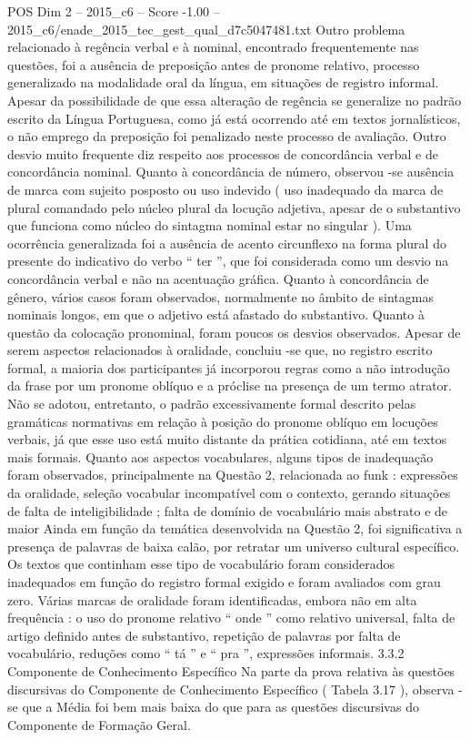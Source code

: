 \begin{textsample}{POS Dim 2 – 2015\_c6 – Score -1.00 – 2015\_c6/enade\_2015\_tec\_gest\_qual\_d7c5047481.txt}
Outro problema relacionado à regência verbal e à nominal, encontrado frequentemente nas questões, foi a ausência de preposição antes de pronome relativo, processo generalizado na modalidade oral da língua, em situações de registro informal.
Apesar da possibilidade de que essa alteração de regência se generalize no padrão escrito da Língua Portuguesa, como já está ocorrendo até em textos jornalísticos, o não emprego da preposição foi penalizado neste processo de avaliação.
Outro desvio muito frequente diz respeito aos processos de concordância verbal e de concordância nominal.
Quanto à concordância de número, observou -se ausência de marca com sujeito posposto ou uso indevido ( uso inadequado da marca de plural comandado pelo núcleo plural da locução adjetiva, apesar de o substantivo que funciona como núcleo do sintagma nominal estar no singular ).
Uma ocorrência generalizada foi a ausência de acento circunflexo na forma plural do presente do indicativo do verbo “ ter ”, que foi considerada como um desvio na concordância verbal e não na acentuação gráfica.
Quanto à concordância de gênero, vários casos foram observados, normalmente no âmbito de sintagmas nominais longos, em que o adjetivo está afastado do substantivo.
Quanto à questão da colocação pronominal, foram poucos os desvios observados.
Apesar de serem aspectos relacionados à oralidade, concluiu -se que, no registro escrito formal, a maioria dos participantes já incorporou regras como a não introdução da frase por um pronome oblíquo e a próclise na presença de um termo atrator.
Não se adotou, entretanto, o padrão excessivamente formal descrito pelas gramáticas normativas em relação à posição do pronome oblíquo em locuções verbais, já que esse uso está muito distante da prática cotidiana, até em textos mais formais.
Quanto aos aspectos vocabulares, alguns tipos de inadequação foram observados, principalmente na Questão 2, relacionada ao funk : expressões da oralidade, seleção vocabular incompatível com o contexto, gerando situações de falta de inteligibilidade ; falta de domínio de vocabulário mais abstrato e de maior Ainda em função da temática desenvolvida na Questão 2, foi significativa a presença de palavras de baixa calão, por retratar um universo cultural específico.
Os textos que continham esse tipo de vocabulário foram considerados inadequados em função do registro formal exigido e foram avaliados com grau zero.
Várias marcas de oralidade foram identificadas, embora não em alta frequência : o uso do pronome relativo “ onde ” como relativo universal, falta de artigo definido antes de substantivo, repetição de palavras por falta de vocabulário, reduções como “ tá ” e “ pra ”, expressões informais. 3.3.2 Componente de Conhecimento Específico Na parte da prova relativa às questões discursivas do Componente de Conhecimento Específico ( Tabela 3.17 ), observa -se que a Média foi bem mais baixa do que para as questões discursivas do Componente de Formação Geral.

\end{textsample}
